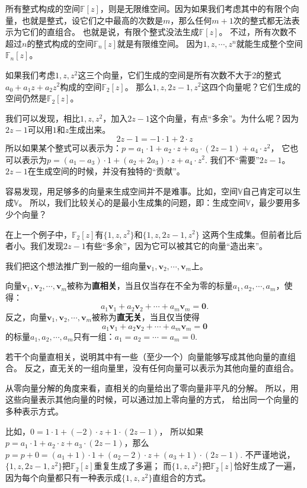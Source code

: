 \documentclass[12pt,UTF8]{ctexbook}
\begin{document}
所有整式构成的空间$\mathbb{F}[z]$，则是无限维空间。因为如果我们考虑其中的有限个向量，也就是整式，设它们之中最高的次数是$m$，那么任何$m+1$次的整式都无法表示为它们的直组合。
也就是说，有限个整式没法生成$\mathbb{F}[z]$。
不过，所有次数不超过$n$的整式构成的空间$\mathbb{F}_n[z]$就是有限维空间。
因为$1, z, \cdots, z^n$就能生成整个空间$\mathbb{F}_n[z]$。

如果我们考虑$1,z,z^2$这三个向量，它们生成的空间是所有次数不大于2的整式$a_0+a_1z+a_2z^2$构成的空间$\mathbb{F}_2[z]$。
那么$1,z,2z-1,z^2$这四个向量呢？它们生成的空间仍然是$\mathbb{F}_2[z]$。

我们可以发现，相比$1,z,z^2$，加入$2z-1$这个向量，有点“多余”。为什么呢？因为$2z-1$可以用$1$和$z$生成出来。
$$ 2z-1 = -1\cdot 1+2\cdot z$$
所以如果某个整式可以表示为：$ p = a_1\cdot 1+a_2\cdot z+a_3\cdot (2z-1)+a_4\cdot z^2$，
它也可以表示为$ p = (a_1-a_3)\cdot 1+(a_2+2a_3)\cdot z+a_4\cdot z^2$.
我们不“需要”$2z-1$。$2z-1$在生成空间的时候，并没有独特的“贡献”。

容易发现，用足够多的向量来生成空间并不是难事。比如，空间$\mathbb{V}$自己肯定可以生成$\mathbb{V}$。
所以，我们比较关心的是最小生成集的问题，即：生成空间$\mathbb{V}$，最少要用多少个向量？

在上一个例子中，$\mathbb{F}_2[z]$有$\{1,z,z^2\}$和$\{1,z,2z-1,z^2\}$
这两个生成集。但前者比后者小。我们发现$2z-1$有些“多余”，因为它可以被其它的向量“造出来”。

我们把这个想法推广到一般的一组向量$\mathbf{v}_1, \mathbf{v}_2 , \cdots , \mathbf{v}_m$上。
\begin{df}\label{df:2_2}
    向量$\mathbf{v}_1, \mathbf{v}_2 , \cdots , \mathbf{v}_m$被称为\textbf{直相关}，当且仅当存在不全为零的标量$a_1, a_2 , \cdots , a_m$，使得：
    $$a_1\mathbf{v}_1+a_2\mathbf{v}_2+\cdots+a_m\mathbf{v}_m = \mathbf{0}.$$
    反之，向量$\mathbf{v}_1, \mathbf{v}_2 , \cdots , \mathbf{v}_m$被称为\textbf{直无关}，当且仅当使得
    $$a_1\mathbf{v}_1+a_2\mathbf{v}_2+\cdots+a_m\mathbf{v}_m = \mathbf{0}$$
    的标量$a_1, a_2 , \cdots , a_m$只有一组：$a_1 = a_2 = \cdots = a_m = 0.$
\end{df}
若干个向量直相关，说明其中有一些（至少一个）向量能够写成其他向量的直组合。
反之，直无关的一组向量里，没有任何向量可以表示为其他向量的直组合。

从零向量分解的角度来看，直相关的向量给出了零向量非平凡的分解。
所以，用这些向量表示其他向量的时候，可以通过加上零向量的方式，
给出同一个向量的多种表示方式。

比如，$0 = 1\cdot 1+(-2)\cdot z+1\cdot(2z-1)$，
所以如果$ p = a_1\cdot 1+a_2\cdot z+a_3\cdot(2z-1)$，那么
$p = p + 0 = (a_1+1)\cdot 1+(a_2-2)\cdot z+(a_3+1)\cdot(2z-1)$. 
不严谨地说，$\{1,z,2z-1,z^2\}$把$\mathbb{F}_2[z]$重复生成了多遍；
而$\{1,z,z^2\}$把$\mathbb{F}_2[z]$恰好生成了一遍，因为每个向量都只有一种表示成$\{1,z,z^2\}$直组合的方式。
\end{document}
